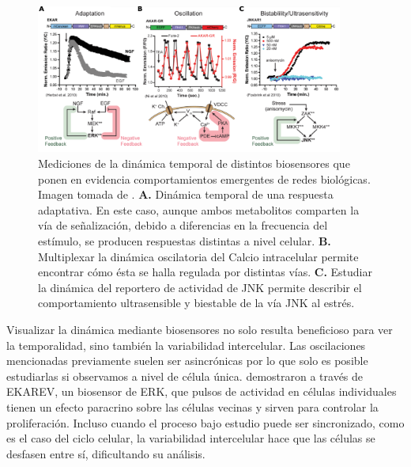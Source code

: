 \begin{figure}
    \centering
    \includegraphics[width=0.9\textwidth]{img/cap_1/dinamica_temporal.pdf}
    \caption{\footnotesize{Mediciones de la dinámica temporal de distintos biosensores que ponen en evidencia comportamientos emergentes de redes biológicas. Imagen tomada de \cite{Greenwald2018}. \textbf{A.} Dinámica temporal de una respuesta adaptativa. En este caso, aunque ambos metabolitos comparten la vía de señalización, debido a diferencias en la frecuencia del estímulo, se producen respuestas distintas a nivel celular. \textbf{B.} Multiplexar la dinámica oscilatoria del Calcio intracelular permite encontrar cómo ésta se halla regulada por distintas vías. \textbf{C.} Estudiar la dinámica del reportero de actividad de JNK permite describir el comportamiento ultrasensible y biestable de la vía JNK al estrés.}}
    \label{fig:dinamica_temporal}
\end{figure}

Visualizar la dinámica mediante biosensores no solo resulta beneficioso para ver la temporalidad, sino también la variabilidad intercelular. Las oscilaciones mencionadas previamente suelen ser asincrónicas por lo que solo es posible estudiarlas si observamos a nivel de célula única. \cite{Aoki2013} demostraron a través de EKAREV, un biosensor de ERK, que pulsos de actividad en células individuales tienen un efecto paracrino sobre las células vecinas y sirven para controlar la proliferación. Incluso cuando el proceso bajo estudio puede ser sincronizado, como es el caso del ciclo celular, la variabilidad intercelular hace que las células se desfasen entre sí, dificultando su análisis.

